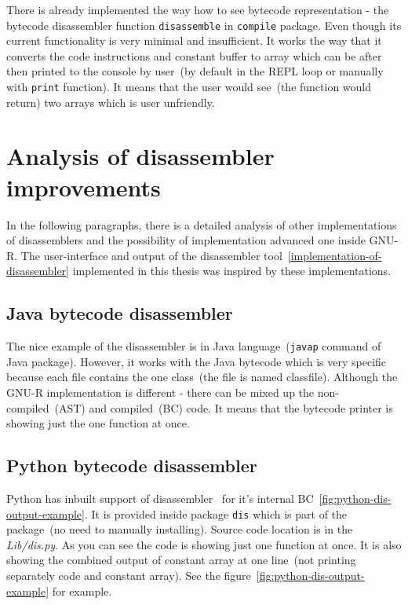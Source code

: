 \documentclass[thesis=M,english]{FITthesis}[2018/10/20]
\newcommand{\code}[1]{\texttt{#1}}
\begin{document}
There is already implemented the way how to see bytecode representation - the bytecode disassembler function \code{disassemble} in \code{compile} package. Even though its current functionality is very minimal and insufficient. It works the way that it converts the code instructions and constant buffer to array which can be after then printed to the console by user~(by default in the REPL loop or manually with \code{print} function). It means that the user would see~(the function would return) two arrays which is user unfriendly. 

\section{Analysis of disassembler improvements}\label{analysis-of-disassembler}

In the following paragraphs, there is a detailed analysis of other implementations of disassemblers and the possibility of implementation advanced one inside GNU-R. The user-interface and output of the disassembler tool~\ref{implementation-of-disassembler} implemented in this thesis was inspired by these implementations.

\subsection{Java bytecode disassembler}

The nice example of the disassembler is in Java language~(\code{javap} command of Java package). However, it works with the Java bytecode which is very specific because each file contains the one class~(the file is named classfile). Although the GNU-R implementation is different - there can be mixed up the non-compiled~(AST) and compiled~(BC) code. It means that the bytecode printer is showing just the one function at once.

\subsection{Python bytecode disassembler}

Python has inbuilt support of disassembler~\cite{Python-disassembler} for it's internal BC~\ref{fig:python-dis-output-example}. It is provided inside package \code{dis} which is part of the package~(no need to manually installing). Source code location is in the \textit{Lib/dis.py}. As you can see the code is showing just one function at once. It is also showing the combined output of constant array at one line~(not printing separately code and constant array). See the figure~\ref{fig:python-dis-output-example} for example.
\end{document}
